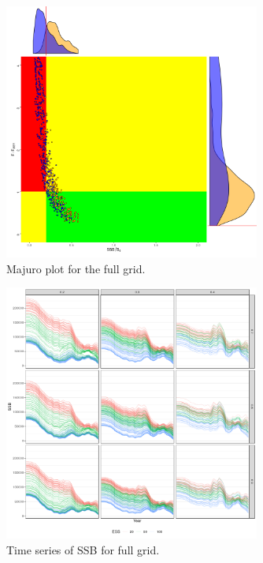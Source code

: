 \documentclass[a4paper]{article}
\begin{document}
\begin{figure}[ht]
\centering
\includegraphics[width=0.75\textwidth]{alb-majuro1-1.png}
\caption{\label{fig:majuro} Majuro  plot for the full grid.}
\end{figure}

\begin{figure}[ht!]
\centering
\includegraphics[width=0.75\textwidth]{alb-ssb-1.png}
\caption{\label{fig:ssb} Time series of SSB for full grid.}
\end{figure}
\end{document}
